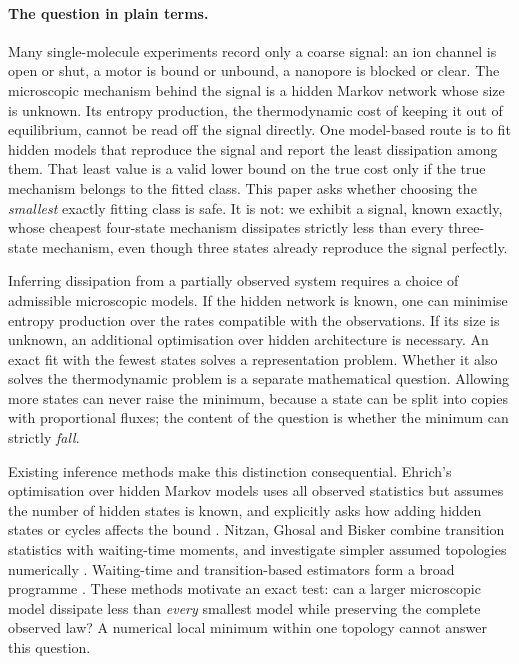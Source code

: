 \documentclass[11pt,a4paper]{article}
\theoremstyle{remark}\newtheorem{remark}[theorem]{Remark}
\begin{document}
\paragraph{The question in plain terms.}
Many single-molecule experiments record only a coarse signal: an ion channel
is open or shut, a motor is bound or unbound, a nanopore is blocked or clear.
The microscopic mechanism behind the signal is a hidden Markov network whose
size is unknown. Its entropy production, the thermodynamic cost of keeping it
out of equilibrium, cannot be read off the signal directly. One model-based
route is to fit hidden models that reproduce the signal and report the least
dissipation among them. That least value is a valid lower bound on the true
cost only if the true mechanism belongs to the fitted class. This paper asks
whether choosing the \emph{smallest} exactly fitting class is safe. It is not:
we exhibit a signal, known exactly, whose cheapest four-state mechanism
dissipates strictly less than every three-state mechanism, even though three
states already reproduce the signal perfectly.

Inferring dissipation from a partially observed system requires a choice of
admissible microscopic models. If the hidden network is known, one can minimise
entropy production over the rates compatible with the observations. If its size
is unknown, an additional optimisation over hidden architecture is necessary.
An exact fit with the fewest states solves a representation problem. Whether
it also solves the thermodynamic problem is a separate mathematical question.
Allowing more states can never raise the minimum, because a state can be split
into copies with proportional fluxes; the content of the question is whether
the minimum can strictly \emph{fall}.

Existing inference methods make this distinction consequential. Ehrich's
optimisation over hidden Markov models uses all observed statistics but assumes
the number of hidden states is known, and explicitly asks how adding hidden
states or cycles affects the bound \cite{ehrich}. Nitzan, Ghosal and Bisker
combine transition statistics with waiting-time moments, and investigate
simpler assumed topologies numerically \cite{nitzan}. Waiting-time and
transition-based estimators form a broad programme
\cite{skinner_wait,skinner_improved,martinez,vdm_prx,harunari,hartich,vdm_prl,deguenther}.
These methods motivate
an exact test: can a larger microscopic model dissipate less than \emph{every}
smallest model while preserving the complete observed law? A numerical local
minimum within one topology cannot answer this question.
\end{document}
